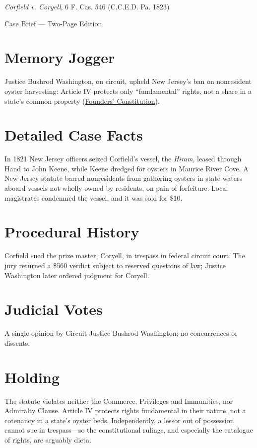 \documentclass[12pt]{article}
\begin{document}
\begin{center}
{\LARGE \textit{Corfield v. Coryell}, 6 F. Cas. 546 (C.C.E.D. Pa. 1823)\par}
\vspace{0.5em}
{\large Case Brief --- Two-Page Edition\par}
\end{center}

\section{Memory Jogger}
Justice Bushrod Washington, on circuit, upheld New Jersey's ban on nonresident oyster harvesting: Article IV protects only ``fundamental'' rights, not a share in a state's common property (\href{https://press-pubs.uchicago.edu/founders/documents/a4_2_1s18.html}{Founders' Constitution}).

\section{Detailed Case Facts}
In 1821 New Jersey officers seized Corfield's vessel, the \textit{Hiram}, leased through Hand to John Keene, while Keene dredged for oysters in Maurice River Cove. A New Jersey statute barred nonresidents from gathering oysters in state waters aboard vessels not wholly owned by residents, on pain of forfeiture. Local magistrates condemned the vessel, and it was sold for \$10.

\section{Procedural History}
Corfield sued the prize master, Coryell, in trespass in federal circuit court. The jury returned a \$560 verdict subject to reserved questions of law; Justice Washington later ordered judgment for Coryell.

\section{Judicial Votes}
A single opinion by Circuit Justice Bushrod Washington; no concurrences or dissents.

\section{Holding}
The statute violates neither the Commerce, Privileges and Immunities, nor Admiralty Clause. Article IV protects rights fundamental in their nature, not a cotenancy in a state's oyster beds. Independently, a lessor out of possession cannot sue in trespass---so the constitutional rulings, and especially the catalogue of rights, are arguably dicta.
\end{document}
